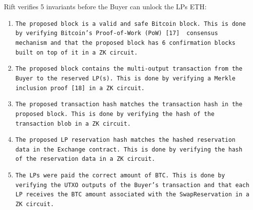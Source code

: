 \documentclass[
]{article}
\newcommand{\code}[1]{\texttt{#1}}
\providecommand{\tightlist}{%
  \setlength{\itemsep}{0pt}\setlength{\parskip}{0pt}}
\begin{document}
{}
{}\vspace*{\baselineskip}

{Rift verifies 5 invariants before the Buyer can unlock the LPs ETH:}
{}\vspace*{\baselineskip}

{}
\addtolength{\leftmargini}{0.6cm} %
\begin{enumerate}
\tightlist
\item
  \code{The proposed block is a valid and safe Bitcoin block. This is done by
  verifying Bitcoin's Proof-of-Work (PoW) {[}17{]} ~consensus mechanism
  and that the proposed block has 6 confirmation blocks built on top of
  it in a ZK circuit.}
\item
  \code{The proposed block contains the multi-output transaction from the
  Buyer to the reserved LP(s). This is done by verifying a Merkle
  inclusion proof {[}18{]} in a ZK circuit.}
\item
  \code{The proposed transaction hash matches the transaction hash in the
  proposed block. This is done by verifying the hash of the transaction
  blob in a ZK circuit.}
\item
  \code{The proposed LP reservation hash matches the hashed reservation data
  in the Exchange contract. This is done by verifying the hash of the
  reservation data in a ZK circuit.}
\item
  \code{The LPs were paid the correct amount of BTC. This is done by
  verifying the UTXO outputs of the Buyer's transaction and that each
  LP receives the BTC amount associated with the SwapReservation in a
  ZK circuit.}
\end{enumerate}

{}
{}\vspace*{\baselineskip}


\hspace{3em}{Once a payment proof is verified, the hash of the block containing the
transaction is stored in a smart contract to be used as a circuit input
for future payment verifications. By implementing a Bitcoin ZK light client, we can verify the state of
Bitcoin on Ethereum while ensuring the same security guarantee as the
Bitcoin network itself (based on computational hashing power). This
allows us to execute arbitrary actions on Ethereum based on verified
changes in Bitcoin's state, thus enabling trustless swaps between the
networks.}

{}\vspace*{\baselineskip}
\end{document}
